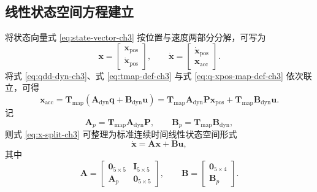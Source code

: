 \subsection{线性状态空间方程建立}

将状态向量式 \eqref{eq:state-vector-ch3} 按位置与速度两部分分解，可写为
\begin{equation}
  \boldsymbol{x}
  =
  \begin{bmatrix}
    \boldsymbol{x}_{\mathrm{pos}} \\
    \dot{\boldsymbol{x}}_{\mathrm{pos}}
  \end{bmatrix},
  \qquad
  \dot{\boldsymbol{x}}
  =
  \begin{bmatrix}
    \dot{\boldsymbol{x}}_{\mathrm{pos}} \\
    \boldsymbol{x}_{\mathrm{acc}}
  \end{bmatrix}.
  \label{eq:x-split-ch3}
\end{equation}
将式 \eqref{eq:qdd-dyn-ch3}、式 \eqref{eq:tmap-def-ch3} 与式 \eqref{eq:q-xpos-map-def-ch3} 依次联立，可得
\begin{equation}
  \boldsymbol{x}_{\mathrm{acc}}
  =
  \boldsymbol{T}_{\mathrm{map}}
  \left(
    \boldsymbol{A}_{\mathrm{dyn}}\boldsymbol{q}
    +
    \boldsymbol{B}_{\mathrm{dyn}}\boldsymbol{u}
  \right)
  =
  \boldsymbol{T}_{\mathrm{map}}\boldsymbol{A}_{\mathrm{dyn}}\boldsymbol{P}\boldsymbol{x}_{\mathrm{pos}}
  +
  \boldsymbol{T}_{\mathrm{map}}\boldsymbol{B}_{\mathrm{dyn}}\boldsymbol{u}.
  \label{eq:xacc-from-qdd-ch3}
\end{equation}
记
\begin{equation}
  \boldsymbol{A}_p = \boldsymbol{T}_{\mathrm{map}}\boldsymbol{A}_{\mathrm{dyn}}\boldsymbol{P},
  \qquad
  \boldsymbol{B}_p = \boldsymbol{T}_{\mathrm{map}}\boldsymbol{B}_{\mathrm{dyn}},
  \label{eq:ap-bp-ch3}
\end{equation}
则式 \eqref{eq:x-split-ch3} 可整理为标准连续时间线性状态空间形式
\begin{equation}
  \dot{\boldsymbol{x}}
  =
  \boldsymbol{A}\boldsymbol{x}
  +
  \boldsymbol{B}\boldsymbol{u},
  \label{eq:linear-state-space-ch3}
\end{equation}
其中
\begin{equation}
  \boldsymbol{A}
  =
  \begin{bmatrix}
    \boldsymbol{0}_{5\times5} & \boldsymbol{I}_{5\times5} \\
    \boldsymbol{A}_p & \boldsymbol{0}_{5\times5}
  \end{bmatrix},
  \qquad
  \boldsymbol{B}
  =
  \begin{bmatrix}
    \boldsymbol{0}_{5\times4} \\
    \boldsymbol{B}_p
  \end{bmatrix}.
  \label{eq:ab-matrix-ch3}
\end{equation}

